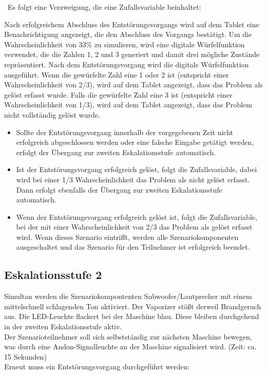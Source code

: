\
Es folgt eine Verzweigung, die eine Zufallsvariable beinhaltet:

{Nach erfolgreichem Abschluss des Entstörungsvorgangs wird auf dem Tablet eine Benachrichtigung angezeigt, die den Abschluss des Vorgangs bestätigt. Um die Wahrscheinlichkeit von 33\% zu simulieren, wird eine digitale Würfelfunktion verwendet, die die Zahlen 1, 2 und 3 generiert und damit drei mögliche Zustände repräsentiert. Nach dem Entstörungsvorgang wird die digitale Würfelfunktion ausgeführt. Wenn die gewürfelte Zahl eine 1 oder 2 ist (entspricht einer Wahrscheinlichkeit von 2/3), wird auf dem Tablet angezeigt, dass das Problem als gelöst erfasst wurde. Falls die gewürfelte Zahl eine 3 ist (entspricht einer Wahrscheinlichkeit von 1/3), wird auf dem Tablet angezeigt, dass das Problem nicht vollständig gelöst wurde. \\

\begin{itemize}
\item
Sollte der Entstörungsvorgang innerhalb der vorgegebenen Zeit nicht erfolgreich abgeschlossen werden oder eine falsche Eingabe getätigt werden, erfolgt der Übergang zur zweiten Eskalationsstufe automatisch.
\item
Ist der Entstörungsvorgang erfolgreich gelöst, folgt die Zufallsvariable, dabei wird bei einer 1/3 Wahrscheinlichkeit das Problem als nicht gelöst erfasst. Dann erfolgt ebenfalls der Übergang zur zweiten Eskalationsstufe automatisch.
\item
\hspace{0pt}Wenn der Entstörungsvorgang erfolgreich gelöst ist, folgt die Zufallsvariable, bei der mit einer Wahrscheinlichkeit von 2/3 das Problem als gelöst erfasst wird. Wenn dieses Szenario eintrifft, werden alle Szenariokomponenten ausgeschaltet und das Szenario für den Teilnehmer ist erfolgreich beendet.
\end{itemize}

\newpage 

\subsection*{Eskalationsstufe 2}

Simultan werden die Szenariokompontenten Subwoofer/Lautprecher mit einem mittelschnell schlagenden Ton aktiviert. Der Vaporizer stößt derweil Brandgeruch aus. Die LED-Leuchte flackert bei der Maschine blau. Diese bleiben durchgehend in der zweiten Eskalationsstufe aktiv.\hspace{0pt} \\
Der Szenarioteilnehmer soll sich selbstständig zur nächsten Maschine bewegen, was durch eine Andon-Signalleuchte an der Maschine signalisiert wird. (Zeit: ca. 15 Sekunden) \\
\hspace{0pt}\marginpar{\footnotesize{ca. 40 Sek.}}Erneut muss ein Entstörungsvorgang durchgeführt werden: 

}
